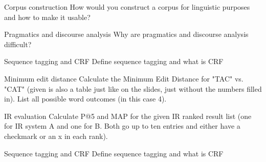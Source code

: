 \documentclass{article}
\begin{document}
\begin{exercise}{Corpus construction}
  How would you construct a corpus for linguistic purposes and how to make it usable?

  \begin{solution}
  \end{solution}
\end{exercise}

\begin{exercise}{Pragmatics and discourse analysis}
  Why are pragmatics and discourse analysis difficult?

  \begin{solution}
  \end{solution}
\end{exercise}

\begin{exercise}{Sequence tagging and CRF}
  Define sequence tagging and what is CRF

  \begin{solution}
  \end{solution}
\end{exercise}

\begin{exercise}{Minimum edit distance}
  Calculate the Minimum Edit Distance for "TAC" vs. "CAT" (given is also a table just like on the slides, just without the numbers filled in). List all possible word outcomes (in this case 4).

  \begin{solution}
  \end{solution}
\end{exercise}

\begin{exercise}{IR evaluation}
  Calculate P@5 and MAP for the given IR ranked result list (one for IR system A and one for B. Both go up to ten entries and either have a checkmark or an x in each rank).

  \begin{solution}
  \end{solution}
\end{exercise}

\begin{exercise}{Sequence tagging and CRF}
  Define sequence tagging and what is CRF

  \begin{solution}
  \end{solution}
\end{exercise}
\end{document}
